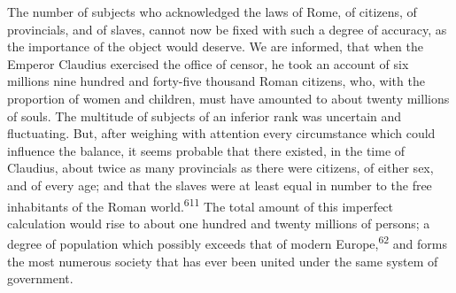 





The number of subjects who acknowledged the laws of Rome, of
citizens, of provincials, and of slaves, cannot now be fixed with
such a degree of accuracy, as the importance of the object would
deserve. We are informed, that when the Emperor Claudius
exercised the office of censor, he took an account of six
millions nine hundred and forty-five thousand Roman citizens,
who, with the proportion of women and children, must have
amounted to about twenty millions of souls. The multitude of
subjects of an inferior rank was uncertain and fluctuating. But,
after weighing with attention every circumstance which could
influence the balance, it seems probable that there existed, in
the time of Claudius, about twice as many provincials as there
were citizens, of either sex, and of every age; and that the
slaves were at least equal in number to the free inhabitants of
the Roman world.\textsuperscript{611} The total amount of this imperfect
calculation would rise to about one hundred and twenty millions
of persons; a degree of population which possibly exceeds that of
modern Europe,\textsuperscript{62} and forms the most numerous society that has
ever been united under the same system of government.

